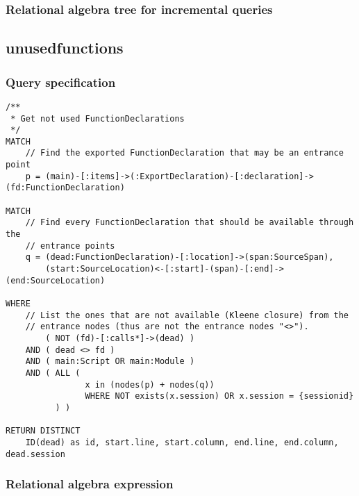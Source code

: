 \subsubsection*{Relational algebra tree for incremental queries}

\subsection{unusedfunctions}

\subsubsection*{Query specification}

\begin{lstlisting}
/**
 * Get not used FunctionDeclarations
 */
MATCH
    // Find the exported FunctionDeclaration that may be an entrance point
    p = (main)-[:items]->(:ExportDeclaration)-[:declaration]->(fd:FunctionDeclaration)

MATCH
    // Find every FunctionDeclaration that should be available through the
    // entrance points
    q = (dead:FunctionDeclaration)-[:location]->(span:SourceSpan),
        (start:SourceLocation)<-[:start]-(span)-[:end]->(end:SourceLocation)

WHERE
    // List the ones that are not available (Kleene closure) from the
    // entrance nodes (thus are not the entrance nodes "<>").
        ( NOT (fd)-[:calls*]->(dead) )
    AND ( dead <> fd )
    AND ( main:Script OR main:Module )
    AND ( ALL (
                x in (nodes(p) + nodes(q))
                WHERE NOT exists(x.session) OR x.session = {sessionid}
          ) )

RETURN DISTINCT
    ID(dead) as id, start.line, start.column, end.line, end.column, dead.session
\end{lstlisting}

\subsubsection*{Relational algebra expression}

